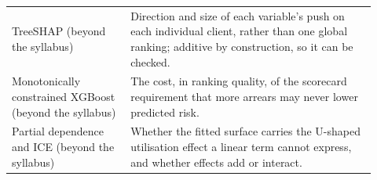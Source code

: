 \begin{table}[htbp]
\begin{tabular}{@{}L{0.30\linewidth}L{0.62\linewidth}@{}}
    \midrule
    TreeSHAP (beyond the syllabus) & Direction and size of each variable's push on each individual client, rather than one global ranking; additive by construction, so it can be checked. \\
    Monotonically constrained XGBoost (beyond the syllabus) & The cost, in ranking quality, of the scorecard requirement that more arrears may never lower predicted risk. \\
    Partial dependence and ICE (beyond the syllabus) & Whether the fitted surface carries the U-shaped utilisation effect a linear term cannot express, and whether effects add or interact. \\
    \bottomrule
  \end{tabular}
\end{table}
